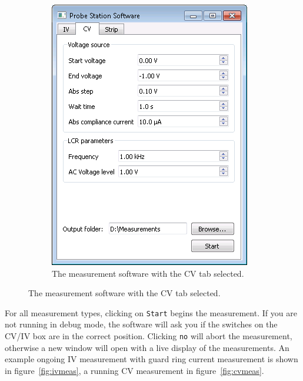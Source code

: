 \documentclass[a4paper]{article}
\begin{document}
\begin{figure}[hbtp]
\begin{subfigure}[t]{0.475\textwidth}
\includegraphics[width=\linewidth]{pictures/softcv.png}
\caption[Software with the CV Tab]{The measurement software with the CV tab selected.}
\label{fig:softwareopencv}
\end{subfigure}
\end{figure}

For all measurement types, clicking on {\tt Start} begins the measurement.
If you are not running in debug mode, the software will ask you if the switches on the CV/IV box are in the correct position.
Clicking {\tt no} will abort the measurement, otherwise a new window will open with a live display of the measurements.
An example ongoing IV measurement with guard ring current measurement is shown in figure~\ref{fig:ivmeas}, a running CV measurement in figure~\ref{fig:cvmeas}.\\
\end{document}
